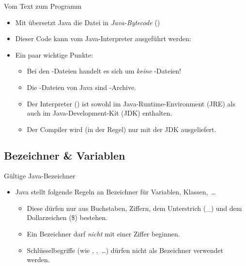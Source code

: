 \begin{frame}{Vom Text zum Programm}
    \begin{itemize}[<+(1)->]
        \widei
        \item Mit  übersetzt Java die Datei in \emph{Java-Bytecode}\pause{} ()
        \item Dieser Code kann vom Java-Interpreter ausgeführt werden:\pause{} 
        \item Ein paar wichtige Punkte: \begin{itemize}
            \widei
            \item Bei den -Dateien handelt es sich um \emph{keine} -Dateien!
            \item Die -Dateien von Java sind -Archive.
            \item Der Interpreter () ist sowohl im Java-Runtime-Environment (JRE) als auch im Java-Development-Kit (JDK) enthalten.
            \item Der Compiler wird (in der Regel) nur mit der JDK ausgeliefert.
        \end{itemize}
    \end{itemize}
\end{frame}

\subsection{Bezeichner \& Variablen}

\begin{frame}{Gültige Java-Bezeichner}
    \begin{itemize}[<+(1)->]
        \widei
        \item Java stellt folgende Regeln an Bezeichner für Variablen, Klassen,~\ldots \begin{itemize}
            \widei
            \item Diese dürfen nur aus Buchstaben, Ziffern, dem Unterstrich (\_) und dem Dollarzeichen (\$) bestehen.
            \item Ein Bezeichner darf \emph{nicht} mit einer Ziffer beginnen.
            \item Schlüsselbegriffe (wie , ,~\ldots) dürfen nicht als Bezeichner verwendet werden.
        \end{itemize}
    \end{itemize}
\end{frame}

